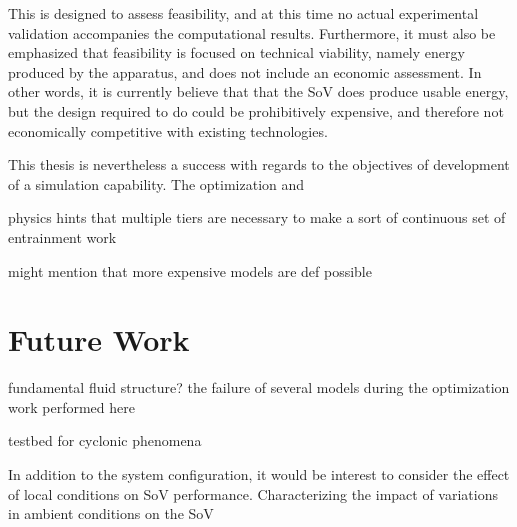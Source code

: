 This is designed to assess feasibility, and at this time no 
actual experimental validation accompanies the computational
results. Furthermore, it must also be emphasized that feasibility is
focused on technical viability, namely energy produced by the apparatus,
and does not include an economic assessment. In other words, it is
currently believe that that the SoV does produce usable energy, 
but the design required to do could be prohibitively expensive, and
therefore not economically competitive with existing technologies. 

This thesis is nevertheless a success with regards to the objectives of
development of a simulation capability. The optimization and 


physics hints that multiple tiers are necessary to make a sort of
continuous set of entrainment work

might mention that more expensive models are def possible

\section{Future Work}


fundamental fluid structure? the failure of several models during the
optimization work performed here 

testbed for cyclonic phenomena


In addition to the system configuration, it would be interest to
consider the effect of local conditions on SoV
performance. Characterizing the impact of variations in ambient
conditions on the SoV


